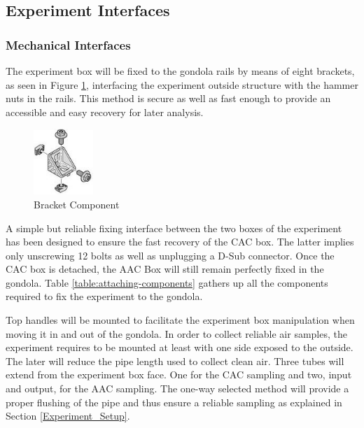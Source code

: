 \subsection{Experiment Interfaces}

\subsubsection{Mechanical Interfaces}
\label{sec:4.2.1}
The experiment box will be fixed to the gondola rails by means of eight brackets, as seen in Figure \ref{fig:bracket}, interfacing the experiment outside structure with the hammer nuts in the rails. This method is secure as well as fast enough to provide an accessible and easy recovery for later analysis.

\begin{figure}[H]
    \centering
    \includegraphics[width=0.2\textwidth]{4-experiment-design/img/Mechanical/bracket.jpg}
    \caption{Bracket Component}
    \label{fig:bracket}
\end{figure}

A simple but reliable fixing interface between the two boxes of the experiment has been designed to ensure the fast recovery of the CAC box. The latter implies only unscrewing 12 bolts as well as unplugging a D-Sub connector. Once the CAC box is detached, the AAC Box will still remain perfectly fixed in the gondola. Table \ref{table:attaching-components} gathers up all the components required to fix the experiment to the gondola. 



Top handles will be mounted to facilitate the experiment box manipulation when moving it in and out of the gondola. 
In order to collect reliable air samples, the experiment requires to be mounted at least with one side exposed to the outside. The later will reduce the pipe length used to collect clean air. Three tubes will extend from the experiment box face. One for the CAC sampling and two, input and output, for the AAC sampling. The one-way selected method will provide a proper flushing of the pipe and thus ensure a reliable sampling as explained in Section \ref{Experiment_Setup}.


